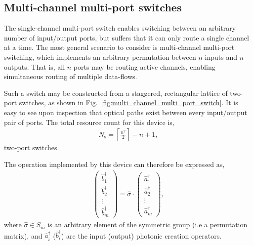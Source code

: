 %
%

\subsection{Multi-channel multi-port switches} 

The single-channel multi-port switch enables switching between an arbitrary number of input/output ports, but suffers that it can only route a single channel at a time. The most general scenario to consider is multi-channel multi-port switching, which implements an arbitrary permutation between $n$ inputs and $n$ outputs. That is, all $n$ ports may be routing active channels, enabling simultaneous routing of multiple data-flows.

Such a switch may be constructed from a staggered, rectangular lattice of two-port switches, as shown in Fig.~\ref{fig:multi_channel_multi_port_switch}. It is easy to see upon inspection that optical paths exist between every input/output pair of ports. The total resource count for this device is,
\begin{align}
N_\mathrm{s} = \left\lceil \frac{n^2}{2}\right\rceil - n + 1,
\end{align}
two-port switches.

The operation implemented by this device can therefore be expressed as,
\begin{align}
	\begin{pmatrix}
  		\hat{b}^\dag_1 \\
  		\hat{b}^\dag_2 \\
  		\vdots \\
  		\hat{b}^\dag_m
\end{pmatrix}=\hat\sigma \cdot \begin{pmatrix}
  		\hat{a}^\dag_1 \\
  		\hat{a}^\dag_2 \\
  		\vdots \\
  		\hat{a}^\dag_m
\end{pmatrix},
\end{align}
where \mbox{$\hat\sigma\in S_m$} is an arbitrary element of the symmetric group (i.e a permutation matrix), and $\hat{a}_i^\dag$ ($\hat{b}_i^\dag$) are the input (output) photonic creation operators.

